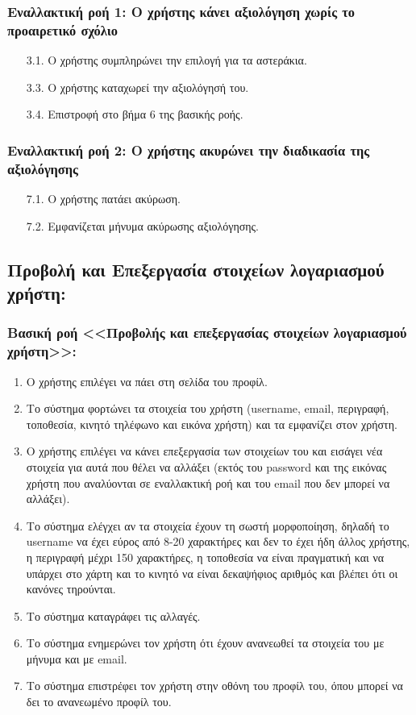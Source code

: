 \documentclass[12pt,a4paper]{article}
\begin{document}
\subsubsection*{Εναλλακτική ροή 1: Ο χρήστης κάνει αξιολόγηση χωρίς το προαιρετικό σχόλιο}
\begin{enumerate}
    \item [3.1.] Ο χρήστης συμπληρώνει την επιλογή για τα αστεράκια.
    \item [3.3.] Ο χρήστης καταχωρεί την αξιολόγησή του.
    \item [3.4.] Επιστροφή στο βήμα 6 της βασικής ροής.
\end{enumerate}

\subsubsection*{Εναλλακτική ροή 2: Ο χρήστης ακυρώνει την διαδικασία της αξιολόγησης}
\begin{enumerate}
    \item [7.1.] Ο χρήστης πατάει ακύρωση.
    \item [7.2.] Εμφανίζεται μήνυμα ακύρωσης αξιολόγησης.
\end{enumerate}

\subsection{Προβολή και Επεξεργασία στοιχείων λογαριασμού χρήστη:}

\subsubsection*{Βασική ροή <<Προβολής και επεξεργασίας στοιχείων λογαριασμού \\χρήστη>>:}
\begin{enumerate}
    \item Ο χρήστης επιλέγει να πάει στη σελίδα του προφίλ. 
    \item Το σύστημα φορτώνει τα στοιχεία του χρήστη (username, email, περιγραφή, τοποθεσία, κινητό τηλέφωνο και εικόνα χρήστη) και τα εμφανίζει στον χρήστη.
    \item Ο χρήστης επιλέγει να κάνει επεξεργασία των στοιχείων του και εισάγει νέα στοιχεία για αυτά που θέλει να αλλάξει (εκτός του password και της εικόνας χρήστη που αναλύονται σε εναλλακτική ροή και του email που δεν μπορεί να αλλάξει). 
    \item Το σύστημα ελέγχει αν τα στοιχεία έχουν τη σωστή μορφοποίηση, δηλαδή το username να έχει εύρος από 8-20 χαρακτήρες και δεν το έχει ήδη άλλος χρήστης, η περιγραφή μέχρι 150 χαρακτήρες, η τοποθεσία να είναι πραγματική και να υπάρχει στο χάρτη και το κινητό να είναι δεκαψήφιος αριθμός και βλέπει ότι οι κανόνες τηρούνται.
    \item Το σύστημα καταγράφει τις αλλαγές.
    \item Το σύστημα ενημερώνει τον χρήστη ότι έχουν ανανεωθεί τα στοιχεία του με μήνυμα και με email.
    \item Το σύστημα επιστρέφει τον χρήστη στην οθόνη του προφίλ του, όπου μπορεί να δει το ανανεωμένο προφίλ του.
\end{enumerate}
\end{document}
